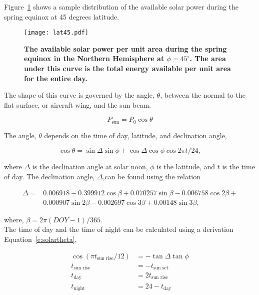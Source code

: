 \documentclass[]{aiaa-tc}%
\begin{document}
    Figure~\ref{f:lat45} shows a sample distribution of the available solar power during the spring equinox at 45 degrees latitude. 
    
\begin{figure}[H]
	\begin{center}
	\texttt{[image: lat45.pdf]}
    \caption{ \textbf{ The available solar power per unit area during the spring equinox in the Northern Hemisphere at $\phi=45^{\circ}$.  The area under this curve is the total energy available per unit area for the entire day.} }
	\label{f:lat45}
	\end{center}
\end{figure}

The shape of this curve is governed by the angle, $\theta$, between the normal to the flat surface, or aircraft wing, and the sun beam.\cite{solar}

\begin{equation}
    \label{e:solarp}
    P_{\text{sun}} = P_0 \cos{\theta}
\end{equation}

The angle, $\theta$ depends on the time of day, latitude, and declination angle,\cite{solar}

    \begin{equation}
        \label{e:solartheta}
        \cos{\theta} = \sin{\Delta} \sin{\phi} + \cos{\Delta} \cos{\phi} \cos{2\pi t/24},
    \end{equation}

    where $\Delta$ is the declination angle at solar noon, $\phi$ is the latitude, and $t$ is the time of day.\cite{solar}  The declination angle, $\Delta$,can be found using the relation\cite{solar} 

    \begin{align}
        \label{e:solardelta}
        \Delta = &0.006918 - 0.399912 \cos{\beta} + 0.070257\sin{\beta} - 0.006758\cos{2\beta} + \nonumber \\
        & 0.000907\sin{2\beta} - 0.002697\cos{3\beta} + 0.00148\sin{3\beta},
    \end{align}

    where, $\beta = 2\pi (DOY-1)/365$.  \\

    The time of day and the time of night can be calculated using a derivation Equation~\ref{e:solartheta}, \cite{solar}

    \begin{align}
        \label{e:solartday}
        \cos{(\pi t_{\text{sun rise}}/12)} &= -\tan{\Delta} \tan{\phi} \\
        \label{e:solarsunrise}
        t_{\text{sun rise}} &= -t_{\text{sun set}} \\
        \label{e:solartday2}
        t_{\text{day}} &= 2t_{\text{sun rise}} \\
        \label{e:solartnight}
        t_{\text{night}} &= 24 - t_{\text{day}}
    \end{align}
\end{document}

